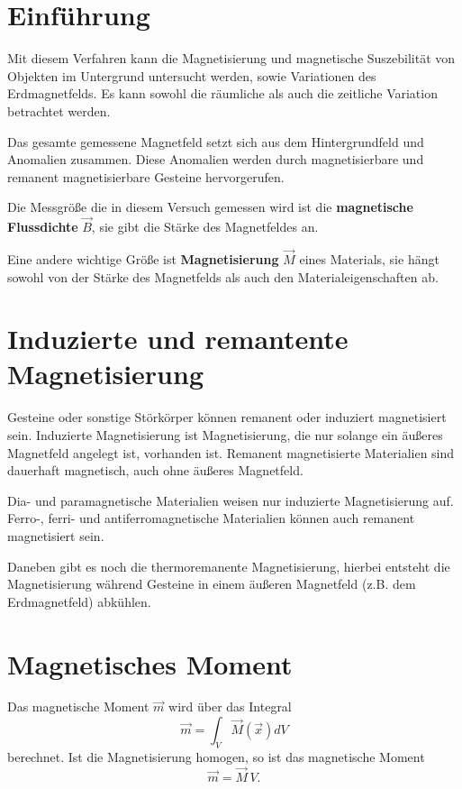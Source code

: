 \section{Einführung}

Mit diesem Verfahren kann die Magnetisierung und magnetische Suszebilität von Objekten im Untergrund untersucht werden, sowie Variationen des Erdmagnetfelds. Es kann sowohl die räumliche als auch die zeitliche Variation 
betrachtet werden.

Das gesamte gemessene Magnetfeld setzt sich aus dem Hintergrundfeld und Anomalien zusammen. Diese Anomalien 
 werden durch magnetisierbare und remanent magnetisierbare Gesteine hervorgerufen. 

Die Messgröße die in diesem Versuch gemessen wird ist die \textbf{magnetische Flussdichte} $\vec{B}$, sie gibt die Stärke des Magnetfeldes an.

Eine andere wichtige Größe ist \textbf{Magnetisierung} $\vec{M}$ eines Materials, sie hängt sowohl von der Stärke des Magnetfelds als auch den Materialeigenschaften ab.

\section{Induzierte und remantente Magnetisierung}
Gesteine oder sonstige Störkörper können remanent oder induziert magnetisiert sein. Induzierte Magnetisierung ist Magnetisierung, die nur solange ein äußeres Magnetfeld angelegt ist, vorhanden ist. Remanent magnetisierte 
Materialien sind dauerhaft magnetisch, auch ohne äußeres Magnetfeld.

Dia- und paramagnetische Materialien weisen nur induzierte Magnetisierung auf. Ferro-, ferri- und antiferromagnetische Materialien können auch remanent magnetisiert sein.

Daneben gibt es noch die thermoremanente Magnetisierung, hierbei entsteht die Magnetisierung während Gesteine in einem äußeren Magnetfeld (z.B. dem Erdmagnetfeld) abkühlen.


\section{Magnetisches Moment}
Das magnetische Moment $\vec{m}$  wird über das Integral
\begin{equation}
\vec{m}  = \int_V \vec{M}(\vec{x}) dV
\end{equation}
berechnet.
Ist die Magnetisierung homogen, so ist das magnetische Moment
\begin{equation}
\vec{m}  = \vec{M} \,V.
\end{equation}

